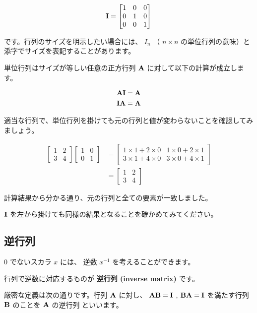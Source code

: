 \[
{\bf I} =
\begin{bmatrix}
1 & 0 & 0 \\
0 & 1 & 0 \\
0 & 0 & 1
\end{bmatrix}
\]


です。行列のサイズを明示したい場合には、 $I_n$ （ $n \times n$ の単位行列の意味）と添字でサイズを表記することがあります。


単位行列はサイズが等しい任意の正方行列 ${\bf A}$ に対して以下の計算が成立します。


\[
\begin{aligned}
{\bf A}{\bf I} &= {\bf A} \\
{\bf I}{\bf A} &= {\bf A}
\end{aligned}
\]


適当な行列で、単位行列を掛けても元の行列と値が変わらないことを確認してみましょう。


\[
\begin{aligned}
\begin{bmatrix}
1 & 2 \\
3 & 4
\end{bmatrix}
\begin{bmatrix}
1 & 0 \\
0 & 1
\end{bmatrix}
&=
\begin{bmatrix}
1 \times 1 + 2 \times 0 & 1 \times 0 + 2 \times 1 \\
3 \times 1 + 4 \times 0 & 3 \times 0 + 4 \times 1
\end{bmatrix} \\
&=
\begin{bmatrix}
1 & 2 \\
3 & 4
\end{bmatrix}
\end{aligned}
\]


計算結果から分かる通り、元の行列と全ての要素が一致しました。

${\bf I}$ を左から掛けても同様の結果となることを確かめてみてください。


\subsection{逆行列}


$0$ でないスカラ $x$ には、 逆数 $x^{-1}$ を考えることができます。

行列で逆数に対応するものが \textbf{逆行列 (inverse matrix)} です。


厳密な定義は次の通りです。行列 ${\bf A}$ に対し、 ${\bf AB} = {\bf I}$ , ${\bf BA} = {\bf I}$ を満たす行列 ${\bf B}$ のことを ${\bf A}$ の逆行列 といいます。

